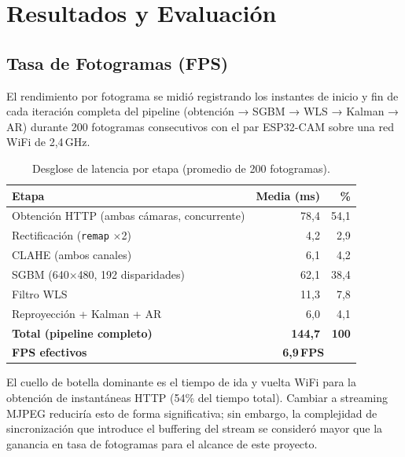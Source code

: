 \documentclass[12pt, a4paper]{article}
\begin{document}
\section{Resultados y Evaluación}

\subsection{Tasa de Fotogramas (FPS)}

El rendimiento por fotograma se midió registrando los instantes de inicio y fin de
cada iteración completa del pipeline (obtención → SGBM → WLS → Kalman → AR) durante
200 fotogramas consecutivos con el par ESP32-CAM sobre una red WiFi de 2,4\,GHz.

\begin{table}[htbp]
\centering
\caption{Desglose de latencia por etapa (promedio de 200 fotogramas).}
\label{tab:fps}
\begin{tabular}{p{6.8cm} r r}
\toprule
\textbf{Etapa}                          & \textbf{Media (ms)} & \textbf{\%} \\
\midrule
Obtención HTTP (ambas cámaras, concurrente) & 78,4  & 54,1 \\
Rectificación (\texttt{remap} $\times$2)    & 4,2   & 2,9  \\
CLAHE (ambos canales)                       & 6,1   & 4,2  \\
SGBM (640$\times$480, 192 disparidades)     & 62,1  & 38,4 \\
Filtro WLS                                  & 11,3  & 7,8  \\
Reproyección + Kalman + AR                  & 6,0   & 4,1  \\
\midrule
\textbf{Total (pipeline completo)}          & \textbf{144,7} & \textbf{100} \\
\textbf{FPS efectivos}                      & \multicolumn{2}{c}{\textbf{6,9\,FPS}} \\
\bottomrule
\end{tabular}
\end{table}

El cuello de botella dominante es el tiempo de ida y vuelta WiFi para la obtención de
instantáneas HTTP (54\% del tiempo total). Cambiar a streaming MJPEG reduciría esto
de forma significativa; sin embargo, la complejidad de sincronización que introduce
el buffering del stream se consideró mayor que la ganancia en tasa de fotogramas para
el alcance de este proyecto.
\end{document}
